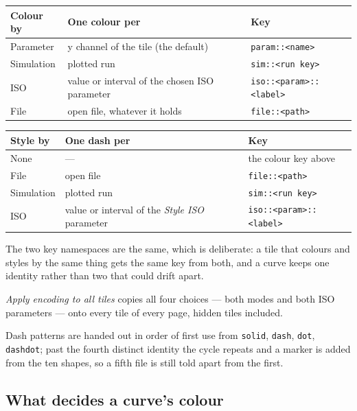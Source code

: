 \documentclass[11pt,a4paper,oneside]{report}
\newcommand{\code}[1]{\texttt{#1}}
\begin{document}
\begin{center}
\small
\begin{tabular}{@{}lp{}p{}@{}}
\toprule
\textbf{Colour by} & \textbf{One colour per} & \textbf{Key} \\
\midrule
Parameter & y channel of the tile (the default) & \code{param::<name>} \\
Simulation & plotted run & \code{sim::<run key>} \\
ISO & value or interval of the chosen ISO parameter & \code{iso::<param>::<label>} \\
File & open file, whatever it holds & \code{file::<path>} \\
\bottomrule
\end{tabular}

\vspace{8pt}

\begin{tabular}{@{}lp{}p{}@{}}
\toprule
\textbf{Style by} & \textbf{One dash per} & \textbf{Key} \\
\midrule
None & --- & the colour key above \\
File & open file & \code{file::<path>} \\
Simulation & plotted run & \code{sim::<run key>} \\
ISO & value or interval of the \emph{Style ISO} parameter & \code{iso::<param>::<label>} \\
\bottomrule
\end{tabular}
\end{center}

The two key namespaces are the same, which is deliberate: a tile that colours and
styles by the same thing gets the same key from both, and a curve keeps one
identity rather than two that could drift apart.

\emph{Apply encoding to all tiles} copies all four choices --- both modes and
both ISO parameters --- onto every tile of every page, hidden tiles included.

Dash patterns are handed out in order of first use from \code{solid},
\code{dash}, \code{dot}, \code{dashdot}; past the fourth distinct identity the
cycle repeats and a marker is added from the ten shapes, so a fifth file is
still told apart from the first.

\subsection{What decides a curve's colour}
\end{document}
